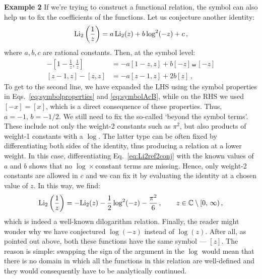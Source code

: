 \documentclass[main.tex]{subfiles}
\begin{document}
\textbf{Example 2} \newline
If we're trying to construct a functional relation, the symbol can also help us to fix the coefficients of the functions. Let us conjecture another identity:
\begin{equation} \label{eq:Li2ref2conj}
    \text{Li}_2\left( \frac{1}{z} \right) = a\,\text{Li}_2(z) + b \log^2(-z) + c\,,
\end{equation}
where $a,b,c$ are rational constants. Then, at the symbol level:
\begin{align}
    -\left[1-\frac{1}{z}, \frac{1}{z}\right] &= -a[1-z, z] + b[-z] \shuffle [-z] \nonumber \\
    [z-1,z] - [z,z] &= -a[z-1, z] + 2 b[z]\,,
\end{align}
To get to the second line, we have expanded the LHS using the symbol properties in Eqs.~\ref{eq:symbolproperties} and \ref{eq:symbolAcB}, while on the RHS we used $[-x]=[x]$, which is a direct consequence of these properties. Thus, $a=-1, \, b=-1/2$. We still need to fix the so-called `beyond the symbol terms'. These include not only the weight-2 constants such as $\pi^2$, but also products of weight-1 constants with a $\log$. The latter type can be often fixed by differentiating both sides of the identity, thus producing a relation at a lower weight. In this case, differentiating Eq.~\ref{eq:Li2ref2conj} with the known values of $a$ and $b$ shows that no $\log \times \text{constant}$ terms are missing. Hence, only weight-2 constants are allowed in $c$ and we can fix it by evaluating the identity at a chosen value of $z$. In this way, we find:
\begin{equation} \label{eq:Li2ref2}
    \text{Li}_2\left( \frac{1}{z} \right) = -\text{Li}_2(z) - \frac{1}{2} \log^2(-z) - \frac{\pi^2}{6}\,, \qquad z \in \mathbb{C} \setminus [0,\, \infty)\,,
\end{equation}
which is indeed a well-known dilogarithm relation. Finally, the reader might wonder why we have conjectured $\log(-z)$ instead of $\log(z)$. After all, as pointed out above, both these functions have the same symbol --- $[z]$. The reason is simple: swapping the sign of the argument in the $\log$ would mean that there is no domain in which all the functions in this relation are well-defined and they would consequently have to be analytically continued.
\end{document}
